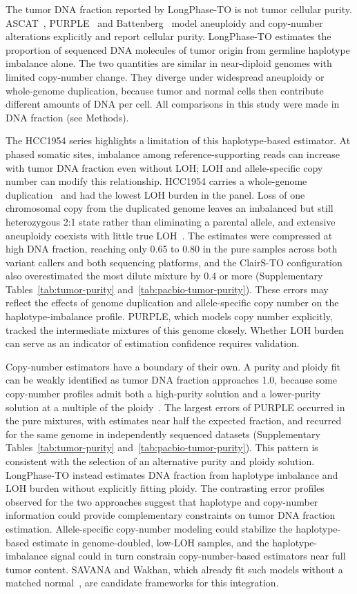 \documentclass[pdflatex,sn-nature]{sn-jnl}
\begin{document}
The tumor DNA fraction reported by LongPhase-TO is not tumor cellular purity. ASCAT~\cite{vanloo2010}, PURPLE~\cite{priestley2019} and Battenberg~\cite{nikzainal2012} model aneuploidy and copy-number alterations explicitly and report cellular purity. LongPhase-TO estimates the proportion of sequenced DNA molecules of tumor origin from germline haplotype imbalance alone. The two quantities are similar in near-diploid genomes with limited copy-number change. They diverge under widespread aneuploidy or whole-genome duplication, because tumor and normal cells then contribute different amounts of DNA per cell. All comparisons in this study were made in DNA fraction (see Methods).

The HCC1954 series highlights a limitation of this haplotype-based estimator. At phased somatic sites, imbalance among reference-supporting reads can increase with tumor DNA fraction even without LOH; LOH and allele-specific copy number can modify this relationship. HCC1954 carries a whole-genome duplication~\cite{ghandi2019} and had the lowest LOH burden in the panel. Loss of one chromosomal copy from the duplicated genome leaves an imbalanced but still heterozygous 2:1 state rather than eliminating a parental allele, and extensive aneuploidy coexists with little true LOH~\cite{bielski2018}. The estimates were compressed at high DNA fraction, reaching only 0.65 to 0.80 in the pure samples across both variant callers and both sequencing platforms, and the ClairS-TO configuration also overestimated the most dilute mixture by 0.4 or more (Supplementary Tables~\ref{tab:tumor-purity} and~\ref{tab:pacbio-tumor-purity}). These errors may reflect the effects of genome duplication and allele-specific copy number on the haplotype-imbalance profile. PURPLE, which models copy number explicitly, tracked the intermediate mixtures of this genome closely. Whether LOH burden can serve as an indicator of estimation confidence requires validation.

Copy-number estimators have a boundary of their own. A purity and ploidy fit can be weakly identified as tumor DNA fraction approaches 1.0, because some copy-number profiles admit both a high-purity solution and a lower-purity solution at a multiple of the ploidy~\cite{vanloo2010,priestley2019}. The largest errors of PURPLE occurred in the pure mixtures, with estimates near half the expected fraction, and recurred for the same genome in independently sequenced datasets (Supplementary Tables~\ref{tab:tumor-purity} and~\ref{tab:pacbio-tumor-purity}). This pattern is consistent with the selection of an alternative purity and ploidy solution. LongPhase-TO instead estimates DNA fraction from haplotype imbalance and LOH burden without explicitly fitting ploidy. The contrasting error profiles observed for the two approaches suggest that haplotype and copy-number information could provide complementary constraints on tumor DNA fraction estimation. Allele-specific copy-number modeling could stabilize the haplotype-based estimate in genome-doubled, low-LOH samples, and the haplotype-imbalance signal could in turn constrain copy-number-based estimators near full tumor content. SAVANA and Wakhan, which already fit such models without a matched normal~\cite{elrick2025,ahmad2025}, are candidate frameworks for this integration.
\end{document}
